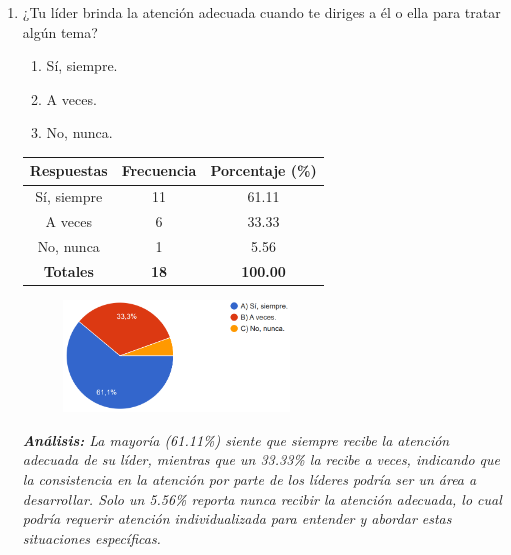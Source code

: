 \documentclass[journal]{IEEEtran}
\begin{document}
\begin{enumerate}
	\item ¿Tu líder brinda la atención adecuada cuando te diriges a él o ella para tratar algún tema?
	\begin{enumerate}
		\item Sí, siempre.
		\item A veces.
		\item No, nunca.
	\end{enumerate}
	\begin{table}[H]
		\renewcommand{\arraystretch}{1.3}
		\centering
		\begin{tabular}{|c|c|c|}
			\hline
			\textbf{Respuestas} & \textbf{Frecuencia} & \textbf{Porcentaje (\%)}\\
			\hline
			Sí, siempre & 11 & 61.11\\
			A veces & 6 & 33.33\\
			No, nunca & 1 &	5.56\\	
			\hline
			\textbf{Totales} &\textbf{18}& \textbf{100.00}\\
			\hline
		\end{tabular}
	\end{table}
	\begin{figure}[h]
		\centering
		\includegraphics[width=06cm]{Pregunta14}
	\end{figure}
	\textit{\textbf{Análisis:} La mayoría (61.11\%) siente que siempre recibe la atención adecuada de su líder, mientras que un 33.33\% la recibe a veces, indicando que la consistencia en la atención por parte de los líderes podría ser un área a desarrollar. Solo un 5.56\% reporta nunca recibir la atención adecuada, lo cual podría requerir atención individualizada para entender y abordar estas situaciones específicas.}\\
	

\end{enumerate}
\end{document}
